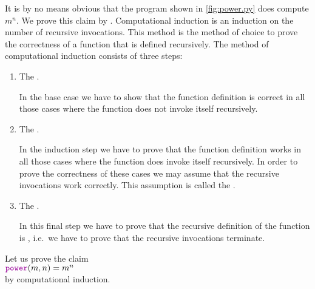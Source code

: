 It is by no means obvious that the program shown in \ref{fig:power.py} does compute
$m^n$.  We prove this claim by  .
Computational induction is an induction on the number of recursive invocations.
This method is the method of choice to prove the correctness of a function that is defined recursively.
The method of computational induction consists of three steps:
\begin{enumerate}
\item The .

      In the base case we have to show that the function definition is correct in all those cases where the function
      does not invoke itself recursively.
\item The .

      In the induction step we have to prove that the function definition works in all those cases where
      the function does invoke itself recursively.  In order to prove the correctness of these cases we may
      assume that the recursive invocations work correctly.  This assumption is called the
      .
\item The .

      In this final step we have to prove that the recursive definition of the function is ,
      i.e.~we have to prove that the recursive invocations terminate.
\end{enumerate}
Let us prove the claim 
\\[0.2cm]
\hspace*{1.3cm}
 $\mytt{power}(m,n) = m^n$
\\[0.2cm] 
by computational induction.
